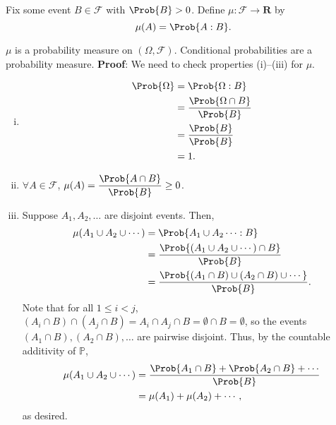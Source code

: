 \begin{Definition}{}{}
    Fix some event $ B\in\mathcal{F} $ with $ \Prob{B}>0 $.
    Define $ \mu\colon \mathcal{F}\to\mathbf{R} $ by
    \[ \mu(A)=\Prob{A\given B}. \]
\end{Definition}
\begin{Theorem}{}{}
    $ \mu $ is a probability measure on $ (\Omega,\mathcal{F}) $.
    Conditional probabilities are a probability measure.
    \tcblower{}
    \textbf{Proof}: We need to check properties (i)--(iii)
    for $ \mu $.
    \begin{enumerate}[(i)]
        \item \begin{align*}
                  \Prob{\Omega}
                   & =\Prob{\Omega\given B}                \\
                   & =\frac{\Prob{\Omega\cap B}}{\Prob{B}} \\
                   & =\frac{\Prob{B}}{\Prob{B}}            \\
                   & =1.
              \end{align*}
        \item $ \forall A\in\mathcal{F} $,
              $ \mu(A)=\dfrac{\Prob{A\cap B}}{\Prob{B}}\ge 0 $.
        \item Suppose $ A_1,A_2,\ldots $ are disjoint events.
              Then,
              \begin{align*}
                  \mu(A_1\cup A_2\cup\cdots)
                   & =\Prob{A_1\cup A_2\cdots\given B}                                 \\
                   & =\frac{\Prob{(A_1\cup A_2\cup\cdots)\cap B}}{\Prob{B}}            \\
                   & =\frac{\Prob{(A_1\cap B)\cup (A_2\cap B)\cup \cdots }}{\Prob{B}}.
              \end{align*}
              Note that for all $ 1\le i<j $, $ (A_i\cap B)\cap (A_j\cap B)=
                  A_i\cap A_j\cap B=\emptyset\cap B=\emptyset $,
              so the events $ (A_1\cap B),(A_2\cap B),\ldots $ are pairwise disjoint.
              Thus, by the countable additivity of $ \mathbb{P} $,
              \begin{align*}
                  \mu(A_1\cup A_2\cup\cdots)
                   & =\frac{\Prob{A_1\cap B}+\Prob{A_2\cap B}+\cdots}{\Prob{B}} \\
                   & =\mu(A_1)+\mu(A_2)+\cdots,
              \end{align*}
              as desired.
    \end{enumerate}
\end{Theorem}
